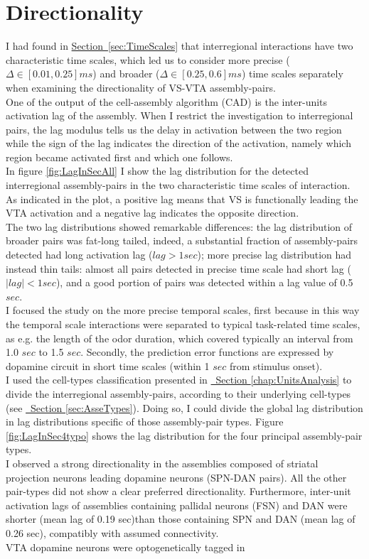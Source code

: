 \section{Directionality} 
\label{sec:Directionality}
 I had found in \hyperref[sec:TimeScales]{Section~\ref*{sec:TimeScales}} that interregional interactions have two characteristic time scales, which led us to consider more precise ($\Delta \in [0.01,0.25] ms$) and broader ($\Delta \in [0.25,0.6] ms$) time scales separately when examining the directionality of VS-VTA assembly-pairs.\\One of the output of the cell-assembly algorithm (CAD) is the inter-units activation lag of the assembly. When I restrict the investigation to interregional pairs, the lag modulus tells us the delay in activation between the two region while the sign of the lag indicates the direction of the activation, namely which region became activated first and which one follows.\\In figure \ref{fig:LagInSecAll} I show the lag distribution for the detected interregional assembly-pairs in the two characteristic time scales of interaction. As indicated in the plot, a positive lag means that VS is functionally leading the VTA activation and a negative lag indicates the opposite direction.\\The two lag distributions showed remarkable differences: the lag distribution of broader pairs was fat-long tailed, indeed, a substantial fraction of assembly-pairs detected had long activation lag ($lag > 1 sec$); more precise lag distribution had instead thin tails: almost all pairs detected in precise time scale had short lag ($|lag| < 1 sec$), and a good portion of pairs was detected within a lag value of 0.5 $sec$.\\I focused the study on the more precise temporal scales, first because in this way the temporal scale interactions were separated to typical task-related time scales, as e.g. the length of the odor duration, which covered typically an interval from 1.0 $sec$ to 1.5 $sec$. Secondly, the prediction error functions are expressed by dopamine circuit in short time scales (within 1 $sec$ from stimulus onset).\\ I used the cell-types classification presented in \hyperref[chap:UnitsAnalysis]{~Section \ref*{chap:UnitsAnalysis}} to divide the interregional assembly-pairs, according to their underlying cell-types (see \hyperref[sec:AsseTypes]{~Section \ref*{sec:AsseTypes}}). Doing so, I could divide the global lag distribution in lag distributions specific of those assembly-pair types. Figure \ref{fig:LagInSec4typo} shows the lag distribution for the four principal assembly-pair types.\\I observed a strong directionality in the assemblies composed of striatal projection neurons leading dopamine neurons (SPN-DAN pairs). All the other pair-types did not show a clear preferred directionality. Furthermore, inter-unit activation lags of assemblies containing pallidal neurons (FSN) and DAN were shorter (mean lag of 0.19 sec)than those containing SPN and DAN (mean lag of 0.26 sec), compatibly with assumed connectivity.\\VTA dopamine neurons were optogenetically tagged in 